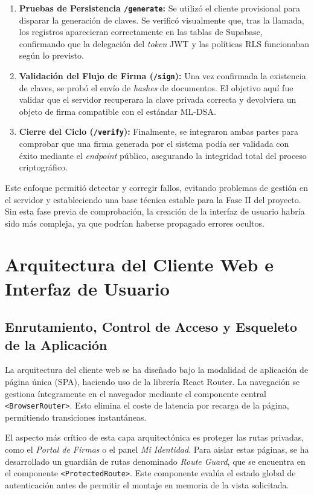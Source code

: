 \documentclass[11pt, a4paper]{report}
\theoremstyle{definition}
\begin{document}
\begin{enumerate}
    \item \textbf{Pruebas de Persistencia \texttt{/generate}:} Se utilizó el cliente provisional para disparar la generación de claves. Se verificó visualmente que, tras la llamada, los registros aparecieran correctamente en las tablas de Supabase, confirmando que la delegación del \textit{token} JWT y las políticas RLS funcionaban según lo previsto.
    \item \textbf{Validación del Flujo de Firma (\texttt{/sign}):} Una vez confirmada la existencia de claves, se probó el envío de \textit{hashes} de documentos. El objetivo aquí fue validar que el servidor recuperara la clave privada correcta y devolviera un objeto de firma compatible con el estándar ML-DSA.
    \item \textbf{Cierre del Ciclo (\texttt{/verify}):} Finalmente, se integraron ambas partes para comprobar que una firma generada por el sistema podía ser validada con éxito mediante el \textit{endpoint} público, asegurando la integridad total del proceso criptográfico.
\end{enumerate}

Este enfoque permitió detectar y corregir fallos, evitando problemas de gestión en el servidor y estableciendo una base técnica estable para la Fase II del proyecto. Sin esta fase previa de comprobación, la creación de la interfaz de usuario habría sido más compleja, ya que podrían haberse propagado errores ocultos.


\section{Arquitectura del Cliente Web e Interfaz de Usuario}
\label{sec:arquitectura_cliente_web}

\subsection{Enrutamiento, Control de Acceso y Esqueleto de la Aplicación}
\label{subsec:enrutamiento_acceso}

La arquitectura del cliente web se ha diseñado bajo la modalidad de aplicación de página única (SPA), haciendo uso de la librería React Router. La navegación se gestiona íntegramente en el navegador mediante el componente central \texttt{<BrowserRouter>}. Esto elimina el coste de latencia por recarga de la página, permitiendo transiciones instantáneas.

El aspecto más crítico de esta capa arquitectónica es proteger las rutas privadas, como el \textit{Portal de Firmas} o el panel \textit{Mi Identidad}. Para aislar estas páginas, se ha desarrollado un guardián de rutas denominado \textit{Route Guard}, que se encuentra en el componente \texttt{<ProtectedRoute>}. Este componente evalúa el estado global de autenticación antes de permitir el montaje en memoria de la vista solicitada.
\end{document}
